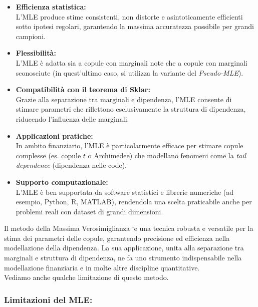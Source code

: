 \documentclass[%
	corpo=11pt,
    twoside,
    stile=classica,
    oldstyle,
    tipotesi=custom,
    greek,
    evenboxes,
]{toptesi}
\begin{document}
\begin{itemize}
	\item \textbf{Efficienza statistica:}\\
	L'MLE produce stime consistenti, non distorte e asintoticamente efficienti sotto ipotesi regolari, garantendo la massima accuratezza possibile per grandi campioni.
	
	\item \textbf{Flessibilità:}\\
	L'MLE è adatta sia a copule con marginali note che a copule con marginali sconosciute (in quest'ultimo caso, si utilizza la variante del \textit{Pseudo-MLE}).
	
	\item \textbf{Compatibilità con il teorema di Sklar:}\\
	Grazie alla separazione tra marginali e dipendenza, l'MLE consente di stimare parametri che riflettono esclusivamente la struttura di dipendenza, riducendo l'influenza delle marginali.
	
	\item \textbf{Applicazioni pratiche:}\\
	In ambito finanziario, l'MLE è particolarmente efficace per stimare copule complesse (es. copule \(t\) o Archimedee) che modellano fenomeni come la \textit{tail dependence} (dipendenza nelle code).
	
	\item \textbf{Supporto computazionale:}\\
	L'MLE è ben supportata da software statistici e librerie numeriche (ad esempio, Python, R, MATLAB), rendendola una scelta praticabile anche per problemi reali con dataset di grandi dimensioni.
\end{itemize}

Il metodo della Massima Verosimiglianza `e una tecnica robusta e versatile per la stima dei parametri delle copule, garantendo precisione
ed efficienza nella modellazione della dipendenza. La sua applicazione,
unita alla separazione tra marginali e struttura di dipendenza, ne fa
uno strumento indispensabile nella modellazione finanziaria e in molte
altre discipline quantitative.\\

Vediamo anche qualche limitazione di questo metodo.\\

\subsubsection{Limitazioni del MLE:}
\end{document}
